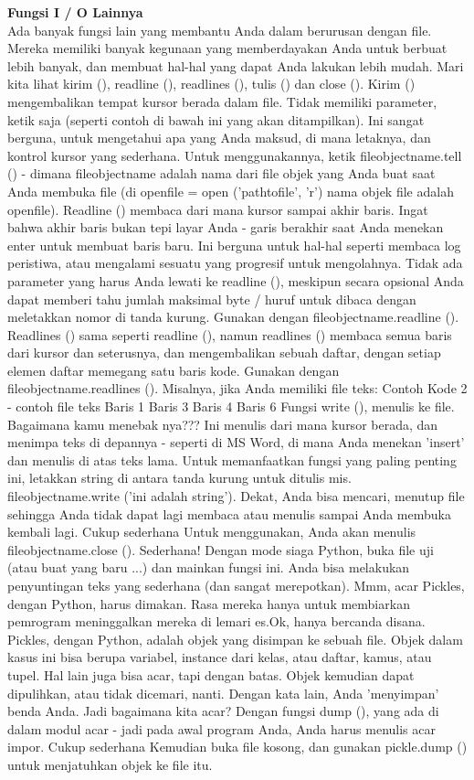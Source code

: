 {\fontsize{14pt}{14pt}\selectfont \textbf{Fungsi I / O Lainnya} \\} 
Ada banyak fungsi lain yang membantu Anda dalam berurusan dengan file. Mereka memiliki banyak kegunaan yang memberdayakan Anda untuk berbuat lebih banyak, dan membuat hal-hal yang dapat Anda lakukan lebih mudah. Mari kita lihat kirim (), readline (), readlines (), tulis () dan close (). Kirim () mengembalikan tempat kursor berada dalam file. Tidak memiliki parameter, ketik saja (seperti contoh di bawah ini yang akan ditampilkan). Ini sangat berguna, untuk mengetahui apa yang Anda maksud, di mana letaknya, dan kontrol kursor yang sederhana. Untuk menggunakannya, ketik fileobjectname.tell () - dimana fileobjectname adalah nama dari file objek yang Anda buat saat Anda membuka file (di openfile = open ('pathtofile', 'r') nama objek file adalah openfile). Readline () membaca dari mana kursor sampai akhir baris. Ingat bahwa akhir baris bukan tepi layar Anda - garis berakhir saat Anda menekan enter untuk membuat baris baru. Ini berguna untuk hal-hal seperti membaca log peristiwa, atau mengalami sesuatu yang progresif untuk mengolahnya. Tidak ada parameter yang harus Anda lewati ke readline (), meskipun secara opsional Anda dapat memberi tahu jumlah maksimal byte / huruf untuk dibaca dengan meletakkan nomor di tanda kurung. Gunakan dengan fileobjectname.readline (). 
Readlines () sama seperti readline (), namun readlines () membaca semua baris dari kursor dan seterusnya, dan mengembalikan sebuah daftar, dengan setiap elemen daftar memegang satu baris kode. Gunakan dengan fileobjectname.readlines (). Misalnya, jika Anda memiliki file teks: 
Contoh Kode 2 - contoh file teks 
Baris 1  
Baris 3  
Baris 4  
Baris 6 
Fungsi write (), menulis ke file. Bagaimana kamu menebak nya??? Ini menulis dari mana kursor berada, dan menimpa teks di depannya - seperti di MS Word, di mana Anda menekan 'insert' dan menulis di atas teks lama. Untuk memanfaatkan fungsi yang paling penting ini, letakkan string di antara tanda kurung untuk ditulis mis. fileobjectname.write ('ini adalah string'). \hspace*{0.5in} Dekat, Anda bisa mencari, menutup file sehingga Anda tidak dapat lagi membaca atau menulis sampai Anda membuka kembali lagi. Cukup sederhana Untuk menggunakan, Anda akan menulis fileobjectname.close (). Sederhana! Dengan mode siaga Python, buka file uji (atau buat yang baru ...) dan mainkan fungsi ini. Anda bisa melakukan penyuntingan teks yang sederhana (dan sangat merepotkan). 
Mmm, acar Pickles, dengan Python, harus dimakan. Rasa mereka hanya untuk membiarkan pemrogram meninggalkan mereka di lemari es.Ok, hanya bercanda disana. Pickles, dengan Python, adalah objek yang disimpan ke sebuah file. Objek dalam kasus ini bisa berupa variabel, instance dari kelas, atau daftar, kamus, atau tupel. Hal lain juga bisa acar, tapi dengan batas. Objek kemudian dapat dipulihkan, atau tidak dicemari, nanti. Dengan kata lain, Anda 'menyimpan' benda Anda. Jadi bagaimana kita acar? Dengan fungsi dump (), yang ada di dalam modul acar - jadi pada awal program Anda, Anda harus menulis acar impor. Cukup sederhana Kemudian buka file kosong, dan gunakan pickle.dump () untuk menjatuhkan objek ke file itu.
